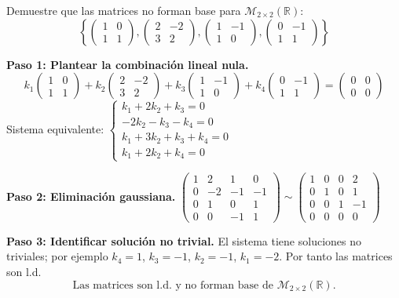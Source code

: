 \begin{example}
Demuestre que las matrices no forman base para $\mathcal{M}_{2\times 2}(\mathbb{R})$:
$$\left\{\begin{pmatrix} 1&0\\1&1\end{pmatrix}, \begin{pmatrix} 2&-2\\3&2\end{pmatrix}, \begin{pmatrix} 1&-1\\1&0\end{pmatrix},\begin{pmatrix} 0&-1\\1&1\end{pmatrix}\right\}$$
\begin{myproof}
\textbf{Paso 1: Plantear la combinación lineal nula.}
$$k_1\begin{pmatrix} 1&0\\1&1\end{pmatrix} + k_2\begin{pmatrix} 2&-2\\3&2\end{pmatrix} + k_3\begin{pmatrix} 1&-1\\1&0\end{pmatrix} + k_4\begin{pmatrix} 0&-1\\1&1\end{pmatrix} = \begin{pmatrix} 0&0\\0&0\end{pmatrix}$$
Sistema equivalente:
$\begin{cases}
k_1 + 2k_2 + k_3 = 0 \\
-2k_2 - k_3 - k_4 = 0 \\
k_1 + 3k_2 + k_3 + k_4 = 0 \\
k_1 + 2k_2 + k_4 = 0
\end{cases}$

\textbf{Paso 2: Eliminación gaussiana.}
$\begin{pmatrix}1 & 2 & 1 & 0 \\0 & -2 & -1 & -1 \\0 & 1 & 0 & 1 \\0 & 0 & -1 & 1\end{pmatrix} \sim \begin{pmatrix}1 & 0 & 0 & 2 \\0 & 1 & 0 & 1 \\0 & 0 & 1 & -1 \\0 & 0 & 0 & 0\end{pmatrix}$

\textbf{Paso 3: Identificar solución no trivial.} El sistema tiene soluciones no triviales; por ejemplo $k_4=1$, $k_3=-1$, $k_2=-1$, $k_1=-2$. Por tanto las matrices son l.d.
$$\boxed{\text{Las matrices son l.d. y no forman base de } \mathcal{M}_{2\times 2}(\mathbb{R}).}$$
\end{myproof}
\end{example}

